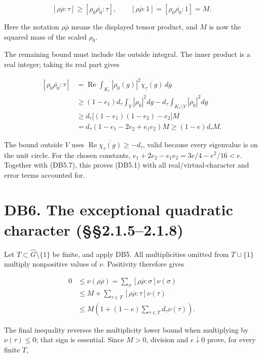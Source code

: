 \documentclass[
]{report}
\begin{document}
\[
 [\rho\overline\rho:\tau]\geq[\rho_0\overline{\rho_0}:\tau],
 \qquad
 [\rho\overline\rho:1]=[\rho_0\overline{\rho_0}:1]=M.
 \tag{DB5.7}
\]

Here the notation \(\rho\overline\rho\) means the displayed tensor
product, and \(M\) is now the squared mass of the scaled \(\rho_0\).

The remaining bound must include the outside integral. The inner product
is a real integer; taking its real part gives

\[
\begin{aligned}
 [\rho_0\overline{\rho_0}:\tau]
 &=\operatorname{Re}\int_{K_c}|\rho_0(g)|^2
                         \overline{\chi_\tau(g)}\,dg\\
 &\geq (1-e_1)d_\tau\int_V|\rho_0|^2dg
       -d_\tau\int_{K_c\setminus V}|\rho_0|^2dg\\
 &\geq d_\tau\bigl[(1-e_1)(1-e_2)-e_2\bigr]M\\
 &=d_\tau(1-e_1-2e_2+e_1e_2)M
 \geq(1-e)d_\tau M.
\end{aligned}
 \tag{DB5.8}
\]

The bound outside \(V\) uses
\(\operatorname{Re}\overline{\chi_\tau(g)}\geq-d_\tau\), valid because
every eigenvalue is on the unit circle. For the chosen constants,
\(e_1+2e_2-e_1e_2=3e/4-e^2/16<e\). Together with (DB5.7), this proves
(DB5.1) with all real/virtual-character and error terms accounted for.

\section{DB6. The exceptional quadratic character
(§§2.1.5--2.1.8)}\label{db6.-the-exceptional-quadratic-character-2.1.52.1.8}

Let \(T\subset\widehat G\setminus\{1\}\) be finite, and apply DB5. All
multiplicities omitted from \(T\cup\{1\}\) multiply nonpositive values
of \(\nu\). Positivity therefore gives

\[
\begin{aligned}
0&\leq\nu(\rho\overline\rho)
 =\sum_\sigma[\rho\overline\rho:\sigma]\nu(\sigma)\\
&\leq M+\sum_{\tau\in T}[\rho\overline\rho:\tau]\nu(\tau)\\
&\leq M\left(1+(1-e)\sum_{\tau\in T}d_\tau\nu(\tau)\right).
\end{aligned}
 \tag{DB6.1}
\]

The final inequality reverses the multiplicity lower bound when
multiplying by \(\nu(\tau)\leq0\); that sign is essential. Since
\(M>0\), division and \(e\downarrow0\) prove, for every finite \(T\),
\end{document}
